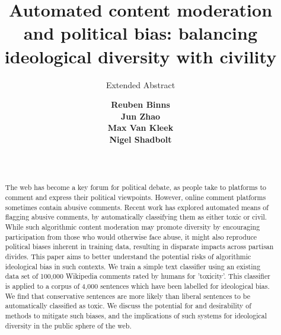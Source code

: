 \documentclass[sigconf]{acmart}
\begin{document}
\title{Automated content moderation and political bias: balancing ideological diversity with civility}

\subtitle{Extended Abstract}


\author{%
\textbf{Reuben Binns}\\
\textbf{Jun Zhao}\\
\textbf{Max Van Kleek}\\
\textbf{Nigel Shadbolt}\\
 \\
 \\
} \\

\renewcommand{\shortauthors}{Binns et al.}


\begin{abstract}
The web has become a key forum for political debate, as people take to platforms to comment and express their political viewpoints. However, online comment platforms sometimes contain abusive comments. Recent work has explored automated means of flagging abusive comments, by automatically classifying them as either toxic or civil. While such algorithmic content moderation may promote diversity by encouraging participation from those who would otherwise face abuse, it might also reproduce political biases inherent in training data, resulting in disparate impacts across partisan divides. This paper aims to better understand the potential risks of algorithmic ideological bias in such contexts. We train a simple text classifier using an existing data set of 100,000 Wikipedia comments rated by humans for 'toxicity'. This classifier is applied to a corpus of 4,000 sentences which have been labelled for ideological bias. We find that conservative sentences are more likely than liberal sentences to be automatically classified as toxic. We discuss the potential for and desirability of methods to mitigate such biases, and the implications of such systems for ideological diversity in the public sphere of the web.
\end{abstract}


\maketitle
\end{document}
